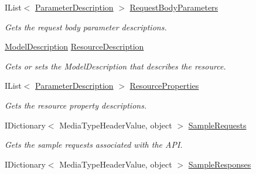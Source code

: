 \begin{DoxyCompactItemize}
I\+List$<$ \hyperlink{class_wis_r_rest_a_p_i_1_1_areas_1_1_help_page_1_1_model_descriptions_1_1_parameter_description}{Parameter\+Description} $>$ \hyperlink{class_wis_r_rest_a_p_i_1_1_areas_1_1_help_page_1_1_models_1_1_help_page_api_model_aaa89a8a846e9dd76c9e4a05419f947ef}{Request\+Body\+Parameters}
\begin{DoxyCompactList}\small\item\em Gets the request body parameter descriptions. \end{DoxyCompactList}\item 
\hyperlink{class_wis_r_rest_a_p_i_1_1_areas_1_1_help_page_1_1_model_descriptions_1_1_model_description}{Model\+Description} \hyperlink{class_wis_r_rest_a_p_i_1_1_areas_1_1_help_page_1_1_models_1_1_help_page_api_model_af0fc101701db64080ae9647ab6be8a0a}{Resource\+Description}
\begin{DoxyCompactList}\small\item\em Gets or sets the Model\+Description that describes the resource. \end{DoxyCompactList}\item 
I\+List$<$ \hyperlink{class_wis_r_rest_a_p_i_1_1_areas_1_1_help_page_1_1_model_descriptions_1_1_parameter_description}{Parameter\+Description} $>$ \hyperlink{class_wis_r_rest_a_p_i_1_1_areas_1_1_help_page_1_1_models_1_1_help_page_api_model_a2a0422b4d982254e45810342b493b055}{Resource\+Properties}
\begin{DoxyCompactList}\small\item\em Gets the resource property descriptions. \end{DoxyCompactList}\item 
I\+Dictionary$<$ Media\+Type\+Header\+Value, object $>$ \hyperlink{class_wis_r_rest_a_p_i_1_1_areas_1_1_help_page_1_1_models_1_1_help_page_api_model_a205d365011f77ee11cffebdc1c167194}{Sample\+Requests}
\begin{DoxyCompactList}\small\item\em Gets the sample requests associated with the A\+P\+I. \end{DoxyCompactList}\item 
I\+Dictionary$<$ Media\+Type\+Header\+Value, object $>$ \hyperlink{class_wis_r_rest_a_p_i_1_1_areas_1_1_help_page_1_1_models_1_1_help_page_api_model_a5e28ca5f607b988f2618122fe265e17a}{Sample\+Responses}

\end{DoxyCompactItemize}
